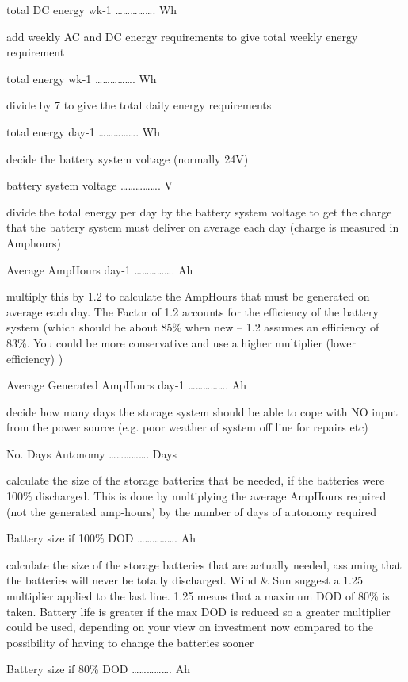 \documentclass[article]{standalone}
\begin{document}
		
		

						total DC energy wk-1 	…………….	Wh

add weekly AC and DC  energy requirements to give total weekly energy requirement 

						total energy wk-1		 …………….	Wh

divide by 7 to give the total daily energy requirements

						total energy day-1 		…………….	Wh

decide the battery system voltage (normally 24V)

						battery system voltage	…………….	V

divide the total energy per day by the battery system voltage to get the charge that the battery system must deliver on average each day (charge is measured in Amphours)

						Average AmpHours day-1	…………….	Ah

multiply this by 1.2 to calculate the AmpHours that must be generated on average each day. The Factor of 1.2 accounts for the efficiency of the battery system (which should be about 85\% when new – 1.2 assumes an efficiency of 83\%. You could be more conservative and use a higher multiplier (lower efficiency) )

				Average Generated AmpHours day-1	…………….	Ah

decide how many days the storage system should be able to cope with NO input from the power source (e.g. poor weather of system off line for repairs etc)

						No. Days Autonomy	…………….	 Days

calculate the size of the storage batteries that be needed, if the batteries were 100\% discharged. This is done by multiplying the average AmpHours required (not the generated amp-hours) by the number of days of autonomy required

						Battery size if 100\% DOD	…………….	Ah

calculate the size of the storage batteries that are actually needed, assuming that the batteries will never be totally discharged. Wind & Sun suggest a 1.25 multiplier applied to the last line. 1.25 means that a maximum DOD of 80\% is taken. Battery life is greater if the max DOD is reduced so a greater multiplier could be used, depending on your view on investment now compared to the possibility of having to change the batteries sooner

						Battery size if 80\% DOD	…………….	Ah
\end{document}
